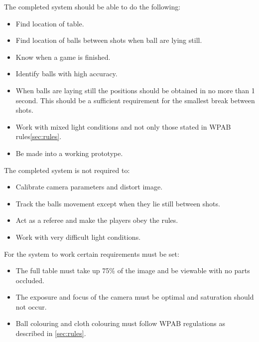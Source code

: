 The completed system should be able to do the following:

\begin{itemize}
\setlength{\itemsep}{0mm}
	\item Find location of table.
	\item Find location of balls between shots when ball are lying still.
	\item Know when a game is finished.
	\item Identify balls with high accuracy.
	\item When balls are laying still the positions should be obtained in no more than 1 second. This should be a sufficient requirement for the smallest break between shots.
	\item Work with mixed light conditions and not only those stated in WPAB rules\ref{sec:rules}.
	\item Be made into a working prototype.
\end{itemize}

The completed system is not required to:

\begin{itemize}
\setlength{\itemsep}{0mm}
	\item Calibrate camera parameters and distort image.
	\item Track the balls movement except when they lie still between shots.
	\item Act as a referee and make the players obey the rules.
	\item Work with very difficult light conditions.
\end{itemize}
For the system to work certain requirements must be set:

\begin{itemize}
\setlength{\itemsep}{0mm}
	\item The full table must take up 75\% of the image and  be viewable with no parts occluded.
	\item The exposure and focus of the camera must be optimal and saturation should not occur.
	\item Ball colouring and cloth colouring must follow WPAB regulations as described in \ref{sec:rules}.
\end{itemize}